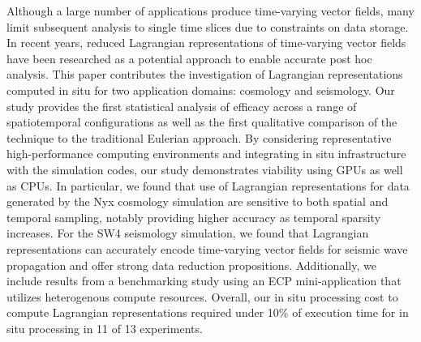 Although a large number of applications produce time-varying vector fields, many limit subsequent analysis to single time slices due to constraints on data storage.
%
In recent years, reduced Lagrangian representations of time-varying vector fields have been researched as a potential approach to enable accurate post hoc analysis.
%
This paper contributes the investigation of Lagrangian representations computed in situ for two application domains: cosmology and seismology.
%
%
Our study provides the first statistical analysis of efficacy across a range of spatiotemporal configurations as well as the first qualitative comparison of the technique to the traditional Eulerian approach.
%
By considering representative high-performance computing environments and integrating in situ infrastructure with the simulation codes, our study demonstrates viability using GPUs as well as CPUs.
%
In particular, we found that use of Lagrangian representations for data generated by the Nyx cosmology simulation are sensitive to both spatial and temporal sampling, notably providing higher accuracy as temporal sparsity increases.
%
For the SW4 seismology simulation, we found that Lagrangian representations can accurately encode time-varying vector fields for seismic wave propagation and offer strong data reduction propositions.
%
Additionally, we include results from a benchmarking study using an ECP mini-application that utilizes heterogenous compute resources.
%
Overall, our in situ processing cost to compute Lagrangian representations required under 10\% of execution time for in situ processing in 11 of 13 experiments.
%
